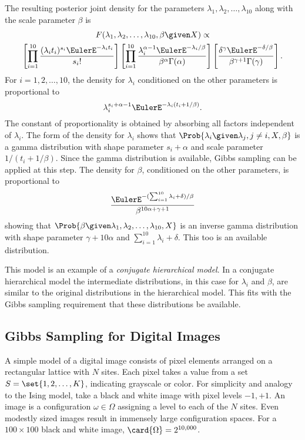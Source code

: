 \documentclass[12pt]{article}
\begin{document}
The resulting posterior joint density for the parameters \( \lambda_1,
\lambda_2, \dots, \lambda_{10} \) along with the scale parameter \(
\beta \) is
\begin{multline*}
    F(\lambda_1, \lambda_2, \dots, \lambda_{10}, \beta \given X) \propto
    \\
    \left[ \prod_{i=1}^{10} \frac{(\lambda_i t_i)^{s_i} \EulerE^{-\lambda_i
    t_i}}{s_i!} \right] \left[ \prod_{i=1}^{10} \frac{\lambda_i^{\alpha-1}
    \EulerE^{-\lambda_i/\beta}}{\beta^{\alpha} \Gamma(\alpha)} \right]
    \left[ \frac{\delta^{\gamma} \EulerE^{-\delta/\beta}}{\beta^{\gamma+1}
    \Gamma(\gamma)} \right].
\end{multline*}
For \( i = 1,2, \dots, 10 \), the density for \( \lambda_i \)
conditioned on the other parameters is proportional to
\[
    \lambda_i^{s_i + \alpha -1} \EulerE^{-\lambda_i (t_i+1/\beta)}.
\] The constant of proportionality is obtained by absorbing all factors
independent of \( \lambda_i \).  The form of the density for \( \lambda_i
\) shows that \( \Prob{\lambda_i \given \lambda_j, j \ne i, X, \beta} \)
is a gamma distribution with shape parameter \( s_i + \alpha \) and
scale parameter \( 1/(t_i + 1/\beta) \).  Since the gamma distribution
is available, Gibbs sampling can be applied at this step.  The density
for \( \beta \), conditioned on the other parameters, is proportional to
\[
    \frac{\EulerE^{-({\sum_{i=1}^{10}\lambda_i + \delta})/\beta}}{\beta^
    {10\alpha+\gamma+1}}
\] showing that \( \Prob{\beta \given \lambda_1, \lambda_2, \dots,
\lambda_{10}, X} \) is an inverse gamma distribution with shape
parameter \( \gamma + 10 \alpha \) and \( \sum\limits_{i=1}^{10} \lambda_i+\delta
\). This too is an available distribution.

This model is an example of a \emph{conjugate hierarchical model}.%
In a conjugate hierarchical model the intermediate distributions, in
this case for \( \lambda_i \) and \( \beta \), are similar to the
original distributions in the hierarchical model.  This fits with the
Gibbs sampling requirement that these distributions be available.

\subsection*{Gibbs Sampling for Digital Images}

A simple model of a digital image consists of pixel elements arranged on
a rectangular lattice with \( N \) sites.  Each pixel takes a value from
a set \( S = \set{1,2, \dots, K} \), indicating grayscale or color.  For
simplicity and analogy to the Ising model, take a black and white image
with pixel levels \( -1, +1 \). An image is a configuration \( \omega
\in \Omega \) assigning a level to each of the \( N \) sites.  Even
modestly sized images result in immensely large configuration spaces.
For a \( 100 \times 100 \) black and white image, \( \card{\Omega} = 2^{10
{,}000} \).
\end{document}

